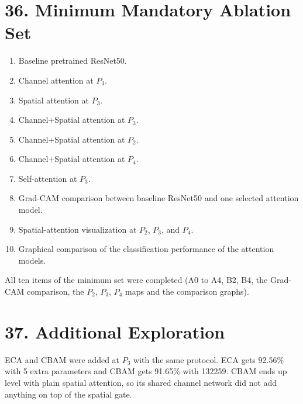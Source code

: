 \documentclass[10pt]{article}
\begin{document}
\section*{36. Minimum Mandatory Ablation Set}

\begin{enumerate}

\item Baseline pretrained ResNet50.

\item Channel attention at $P_3$.

\item Spatial attention at $P_3$.

\item Channel+Spatial attention at $P_3$.

\item Channel+Spatial attention at $P_2$.

\item Channel+Spatial attention at $P_4$.

\item Self-attention at $P_3$.

\item Grad-CAM comparison between baseline ResNet50 and one selected
attention model.

\item Spatial-attention visualization at $P_2$, $P_3$, and $P_4$.

\item Graphical comparison of the classification performance of the attention
models.

\end{enumerate}

All ten items of the minimum set were completed (A0 to A4, B2, B4, the Grad-CAM comparison, the $P_2$, $P_3$, $P_4$ maps and the comparison graphs).

\section*{37. Additional Exploration}

ECA and CBAM were added at $P_3$ with the same protocol. ECA gets 92.56\% with 5 extra parameters and CBAM gets 91.65\% with 132259. CBAM ends up level with plain spatial attention, so its shared channel network did not add anything on top of the spatial gate.
\end{document}
